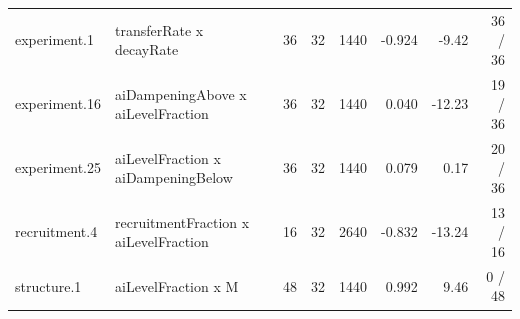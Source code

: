 \begin{table}[htbp]
\begin{tabular}{l l r r r r r r}
    experiment.1 & transferRate x decayRate & 36 & 32 & 1440 & -0.924 & -9.42 & 36 / 36 \\
    experiment.16 & aiDampeningAbove x aiLevelFraction & 36 & 32 & 1440 & 0.040 & -12.23 & 19 / 36 \\
    experiment.25 & aiLevelFraction x aiDampeningBelow & 36 & 32 & 1440 & 0.079 & 0.17 & 20 / 36 \\
    recruitment.4 & recruitmentFraction x aiLevelFraction & 16 & 32 & 2640 & -0.832 & -13.24 & 13 / 16 \\
    structure.1 & aiLevelFraction x M & 48 & 32 & 1440 & 0.992 & 9.46 & 0 / 48 \\
    \bottomrule
  \end{tabular}
\end{table}

